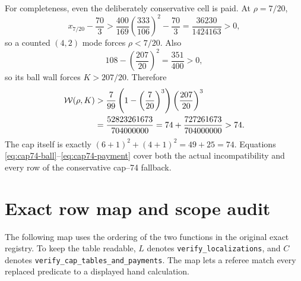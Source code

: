 \documentclass[11pt]{article}
\newcommand{\W}{\mathcal W}
\begin{document}
For completeness, even the deliberately conservative cell is paid.  At
\(\rho=7/20\),
\begin{equation}
 x_{7/20}-\frac{70}{3}
 >\frac{400}{169}\left(\frac{333}{106}\right)^2-\frac{70}{3}
 =\frac{36230}{1424163}>0,
 \label{eq:cap74-rho}
\end{equation}
so a counted \((4,2)\) mode forces \(\rho<7/20\).  Also
\begin{equation}
 108-\left(\frac{207}{20}\right)^2=\frac{351}{400}>0,
 \label{eq:cap74-K}
\end{equation}
so its ball wall forces \(K>207/20\).  Therefore
\begin{align}
 \W(\rho,K)
 &>\frac7{99}\left(1-\left(\frac7{20}\right)^3\right)
       \left(\frac{207}{20}\right)^3\notag\\
 &=\frac{52823261673}{704000000}
 =74+\frac{727261673}{704000000}>74.
 \label{eq:cap74-payment}
\end{align}
The cap itself is exactly
\((6+1)^2+(4+1)^2=49+25=74\).  Equations
\eqref{eq:cap74-ball}--\eqref{eq:cap74-payment} cover both the actual
incompatibility and every row of the conservative cap--74 fallback.

\section{Exact row map and scope audit}

The following map uses the ordering of the two functions in the original
exact registry.  To keep the table readable, \(L\) denotes
\texttt{verify\_localizations}, and \(C\) denotes
\texttt{verify\_cap\_tables\_and\_payments}.  The map lets a referee match
every replaced predicate to a displayed hand calculation.
\end{document}
